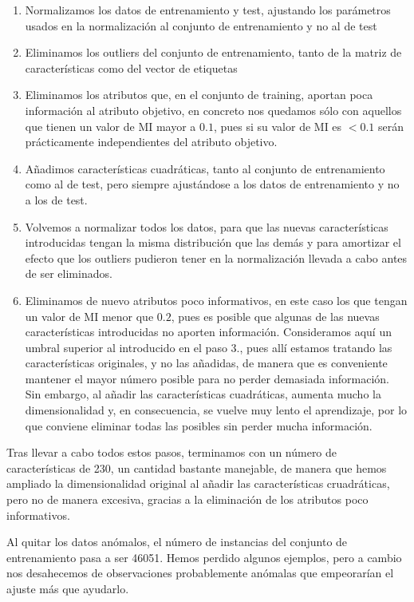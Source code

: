 \documentclass[a4]{article}
\begin{document}
\begin{enumerate}
	\item Normalizamos los datos de entrenamiento y test, ajustando los parámetros usados en la normalización al conjunto de entrenamiento y no al de test
	\item Eliminamos los outliers del conjunto de entrenamiento, tanto de la matriz de características como del vector de etiquetas
	\item Eliminamos los atributos que, en el conjunto de training, aportan poca información al atributo objetivo, en concreto nos quedamos sólo con aquellos que tienen un valor de MI mayor a $ 0.1 $, pues si su valor de MI es $<0.1$ serán prácticamente independientes del atributo objetivo.
	\item Añadimos características cuadráticas, tanto al conjunto de entrenamiento como al de test, pero siempre ajustándose a los datos de entrenamiento y no a los de test. 
	\item Volvemos a normalizar todos los datos, para que las nuevas características introducidas tengan la misma distribución que las demás y para amortizar el efecto que los outliers pudieron tener en la normalización llevada a cabo antes de ser eliminados. 
	\item Eliminamos de nuevo atributos poco informativos, en este caso los que tengan un valor de MI menor que $ 0.2 $, pues es posible que algunas de las nuevas características introducidas no aporten información. Consideramos aquí un umbral superior al introducido en el paso 3., pues allí estamos tratando las características originales, y no las añadidas, de manera que es conveniente mantener el mayor número posible para no perder demasiada información. Sin embargo, al añadir las características cuadráticas, aumenta mucho la dimensionalidad y, en consecuencia, se vuelve muy lento el aprendizaje, por lo que conviene eliminar todas las posibles sin perder mucha información. 
	  
\end{enumerate}

Tras llevar a cabo todos estos pasos, terminamos con un número de características de 230, un cantidad bastante manejable, de manera que hemos ampliado la dimensionalidad original al añadir las características cruadráticas, pero no de manera excesiva, gracias a la eliminación de los atributos poco informativos. 

Al quitar los datos anómalos, el número de instancias del conjunto de entrenamiento pasa a ser 46051. Hemos perdido algunos ejemplos, pero a cambio nos desahecemos de observaciones probablemente anómalas que empeorarían el ajuste más que ayudarlo. 
\end{document}
